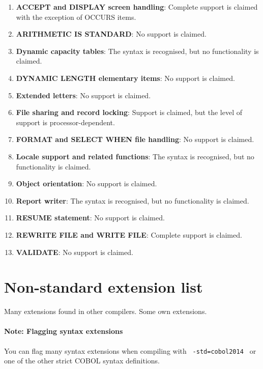 \begin{enumerate}
\item \textbf{ACCEPT and DISPLAY screen handling}: Complete support is claimed with the exception of OCCURS items.
\item \textbf{ARITHMETIC IS STANDARD}: No support is claimed.
\item \textbf{Dynamic capacity tables}: The syntax is recognised, but no functionality is claimed.
\item \textbf{DYNAMIC LENGTH elementary items}: No support is claimed.
\item \textbf{Extended letters}: No support is claimed.
\item \textbf{File sharing and record locking}: Support is claimed, but the level of support is processor-dependent. %
\item \textbf{FORMAT and SELECT WHEN file handling}: No support is claimed.
\item \textbf{Locale support and related functions}: The syntax is recognised, but no functionality is claimed.  %
\item \textbf{Object orientation}: No support is claimed.
\item \textbf{Report writer}: The syntax is recognised, but no functionality is claimed.
\item \textbf{RESUME statement}: No support is claimed.
\item \textbf{REWRITE FILE and WRITE FILE}: Complete support is claimed.
\item \textbf{VALIDATE}: No support is claimed.
\end{enumerate}


\section{Non-standard extension list}

Many extensions found in other compilers.  %
Some own extensions.  %

\paragraph{Note: Flagging syntax extensions}

You can flag many syntax extensions when compiling with \texttt{ -std=cobol2014 } or one of the other strict COBOL syntax definitions.

